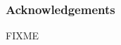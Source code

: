 \documentclass[a4paper]{article}
\begin{document}
\subsubsection{Acknowledgements}
FIXME
\\

 


%
%
%
\end{document}
